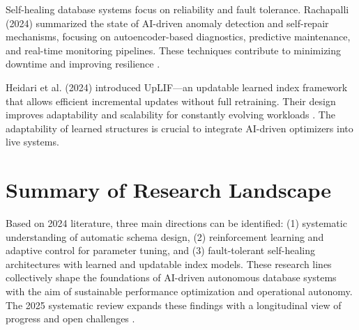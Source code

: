 \documentclass[sigconf]{acmart}
\begin{document}
Self-healing database systems focus on reliability and fault tolerance. Rachapalli (2024) summarized the state of AI-driven anomaly detection and self-repair mechanisms, focusing on autoencoder-based diagnostics, predictive maintenance, and real-time monitoring pipelines. These techniques contribute to minimizing downtime and improving resilience \citep{rachapalli2024selfhealing}.

Heidari et al. (2024) introduced UpLIF—an updatable learned index framework that allows efficient incremental updates without full retraining. Their design improves adaptability and scalability for constantly evolving workloads \citep{heidari2024uplif}. The adaptability of learned structures is crucial to integrate AI-driven optimizers into live systems.

\section*{Summary of Research Landscape}
Based on 2024 literature, three main directions can be identified: (1) systematic understanding of automatic schema design, (2) reinforcement learning and adaptive control for parameter tuning, and (3) fault-tolerant self-healing architectures with learned and updatable index models. These research lines collectively shape the foundations of AI-driven autonomous database systems with the aim of sustainable performance optimization and operational autonomy. The 2025 systematic review expands these findings with a longitudinal view of progress and open challenges \citep{nzenwata2025autonomous}.



\end{document}
